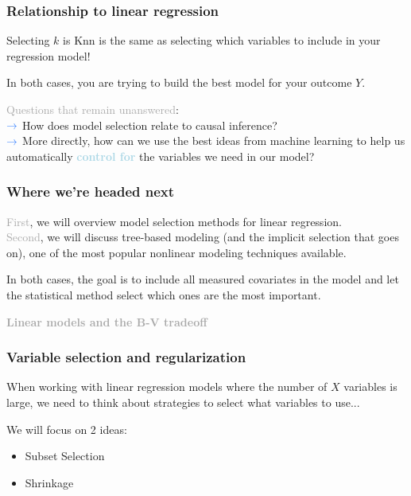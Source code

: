 \documentclass{beamer}
\newcommand{\bo}[1]{\textcolor{burntorange}{#1}}
\newcommand{\lb}[1]{\textcolor{lightblue}{#1}}
\newcommand{\dg}[1]{\textcolor{darkgray}{#1}}
\newcommand{\ba}{$\lb{{\small \rightarrow } }$ \hspace{0.5mm}}
\newcommand{\sk}{\vspace{.5cm}}
\newcommand{\sko}{\vspace{.1in}}
\newcommand{\skoo}{\vspace{.2in}}
\begin{document}
\begin{frame}
	\frametitle{Relationship to linear regression}
	
	Selecting $k$ is Knn is the same as selecting which variables to include in your regression model! \\ \sk 
	
	In both cases, you are trying to build the \bo{best model} for your outcome $Y$. \\ \sk
	
	\dg{Questions that remain unanswered}: \\ \sko
	\ba How does model selection relate to causal inference? \\ \sko
	\ba More directly, how can we use the best ideas from machine learning to help us automatically \lb{\bf control for} the variables we need in our model?
\end{frame}

\begin{frame}
	\frametitle{Where we're headed next}
	
	
\dg{First}, we will overview model selection methods for linear regression. \\ \sk \dg{Second}, we will discuss tree-based modeling (and the implicit selection that goes on), one of the most popular nonlinear modeling techniques available.

\sk\sk

In both cases, the goal is to include all measured covariates in the model and let the statistical method \bo{select} which ones are the most important.

\end{frame}


\begin{frame}

\sk\sk
\dg{\Large \bf Linear models and the B-V tradeoff}
\end{frame}

\begin{frame}
\frametitle{Variable selection and regularization} 
When working with linear regression models where the number of $X$ variables is large, we need to think about strategies to {\color{lightblue}select what variables to use...}

\skoo

We will focus on 2 ideas:
\begin{itemize} 
\sko
\item Subset Selection
\item Shrinkage
\end{itemize}
\end{frame}
\end{document}
